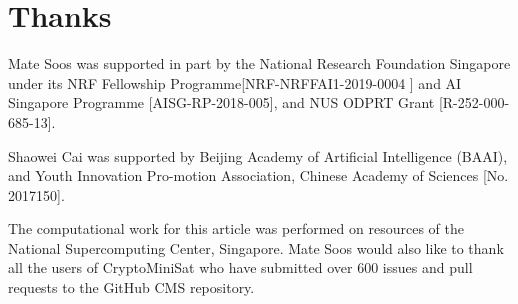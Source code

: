 \documentclass[final]{ieee}
\begin{document}
\section{Thanks}
Mate Soos was supported in part by the National Research Foundation Singapore under its NRF Fellowship Programme[NRF-NRFFAI1-2019-0004 ] and AI Singapore Programme [AISG-RP-2018-005],  and NUS ODPRT Grant [R-252-000-685-13].

Shaowei Cai was supported  by Beijing Academy of Artificial Intelligence (BAAI), and Youth Innovation Pro-motion Association, Chinese Academy of Sciences [No. 2017150].

The computational work for this article was performed on resources of the National Supercomputing Center, Singapore\cite{nscc}. Mate Soos would also like to thank all the users of CryptoMiniSat who have submitted over 600 issues and pull requests to the GitHub CMS repository\cite{CMS}.




\vfill
\pagebreak
\end{document}
